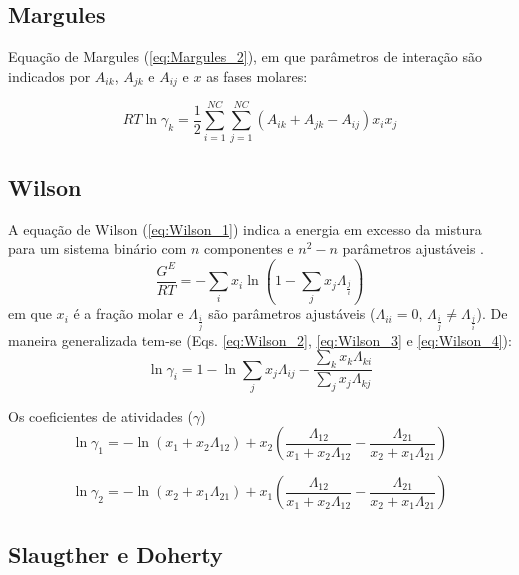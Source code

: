 	\subsection{Margules}
	
	Equação de Margules (\ref{eq:Margules_2}), em que parâmetros de interação são indicados por $A_{ik}$, $A_{jk}$ e $A_{ij}$ e $x$ as fases molares:
	
\begin{equation}\label{eq:Margules_2}
	RT\ln\gamma_{k}=\frac{1}{2}\sum_{i=1}^{NC} \sum_{j=1}^{NC}(A_{ik}+A_{jk}-A_{ij})x_{i}x_{j}
\end{equation}
	
	\subsection{Wilson}
	
	A equação de Wilson (\ref{eq:Wilson_1}) indica a energia em excesso da mistura para um sistema binário com $n$ componentes e $n^{2}-n$ parâmetros ajustáveis \cite{Rocha2011}.
	\begin{equation}\label{eq:Wilson_1}
	\frac{G^{E}}{RT}=-\sum_{i}x_{i}\ln\left(1-\sum_{j}x_{j}\Lambda_{\frac{j}{i}}\right)
	\end{equation}
	em que $x_{i}$ é a fração molar e $\Lambda_{\frac{i}{j}}$ são parâmetros ajustáveis ($\Lambda_{ii}=0$, $\Lambda_{\frac{i}{j}}\neq\Lambda_{\frac{j}{i}}$). De maneira generalizada tem-se (Eqs. \ref{eq:Wilson_2}, \ref{eq:Wilson_3} e \ref{eq:Wilson_4}):
	\begin{equation}\label{eq:Wilson_2}
	\ln\gamma_{i}=1-\ln\sum_{j}x_{j}\Lambda_{ij}-\frac{\displaystyle\sum_{k}x_{k}\Lambda_{ki}} {\displaystyle\sum_{j}x_{j}\Lambda_{kj}}
	\end{equation}
	
	Os coeficientes de atividades ($\gamma$)
	\begin{equation}\label{eq:Wilson_3}
	\ln \gamma_{1}=-\ln(x_1+x_2\Lambda_{12} )+x_{2}\left(\frac{\Lambda_{12}}{x_1+x_2\Lambda_{12}}-\frac{\Lambda_{21}}{x_2+x_1\Lambda_{21}}\right)
	\end{equation}
	
	\begin{equation}\label{eq:Wilson_4}
	\ln \gamma_{2}=-\ln(x_2+x_1\Lambda_{21} )+x_{1}\left(\frac{\Lambda_{12}}{x_1+x_2\Lambda_{12}}-\frac{\Lambda_{21}}{x_2+x_1\Lambda_{21}}\right)
	\end{equation}
	
	\subsection{Slaugther e Doherty}
	

